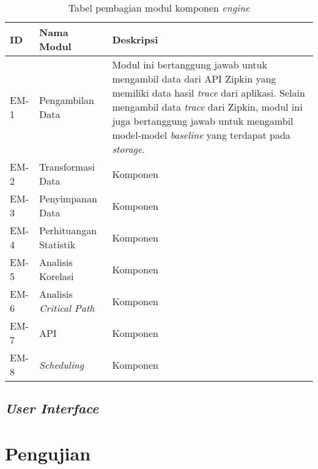 \begin{small}
	\begin{longtable}{ | p{1cm} | p{3cm} | p{10cm} | }
		\caption{Tabel pembagian modul komponen \textit{engine}}
		\label{engine-module}                                                           
		\\ \hline
		\centering\bfseries{ID} & \centering\bfseries{Nama Modul} & \centering\bfseries{Deskripsi} \tabularnewline \hline
		\endfirsthead
		EM-1 & Pengambilan Data & Modul ini bertanggung jawab untuk mengambil data dari API Zipkin yang memiliki data hasil \textit{trace} dari aplikasi. Selain mengambil data \textit{trace} dari Zipkin, modul ini juga bertanggung jawab untuk mengambil model-model \textit{baseline} yang terdapat pada \textit{storage}. \\ \hline
		EM-2 & Transformasi Data & Komponen \\ \hline
		EM-3 & Penyimpanan Data & Komponen \\ \hline
		EM-4 & Perhituangan Statistik & Komponen \\ \hline
		EM-5 & Analisis Korelasi & Komponen \\ \hline
		EM-6 & Analisis \textit{Critical Path} & Komponen \\ \hline
		EM-7 & API & Komponen \\ \hline
		EM-8 & \textit{Scheduling} & Komponen \\ \hline
	\end{longtable}
\end{small}

%		

\subsection{\textit{User Interface}}


\section{Pengujian}
